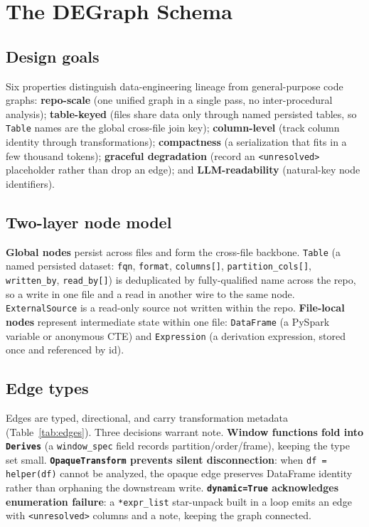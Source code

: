 \documentclass[11pt]{article}
\newcommand{\code}[1]{\texttt{#1}}
\begin{document}
\section{The DEGraph Schema}

\subsection{Design goals}
Six properties distinguish data-engineering lineage from general-purpose code
graphs: \textbf{repo-scale} (one unified graph in a single pass, no
inter-procedural analysis); \textbf{table-keyed} (files share data only through
named persisted tables, so \code{Table} names are the global cross-file join key);
\textbf{column-level} (track column identity through transformations);
\textbf{compactness} (a serialization that fits in a few thousand tokens);
\textbf{graceful degradation} (record an \code{<unresolved>} placeholder rather than
drop an edge); and \textbf{LLM-readability} (natural-key node identifiers).

\subsection{Two-layer node model}
\textbf{Global nodes} persist across files and form the cross-file backbone.
\code{Table} (a named persisted dataset: \code{fqn}, \code{format},
\code{columns[]}, \code{partition_cols[]}, \code{written_by}, \code{read_by[]}) is
deduplicated by fully-qualified name across the repo, so a write in one file and a
read in another wire to the same node. \code{ExternalSource} is a read-only source
not written within the repo. \textbf{File-local nodes} represent intermediate state
within one file: \code{DataFrame} (a PySpark variable or anonymous CTE) and
\code{Expression} (a derivation expression, stored once and referenced by id).

\subsection{Edge types}
Edges are typed, directional, and carry transformation metadata
(Table~\ref{tab:edges}). Three decisions warrant note. \textbf{Window functions
fold into \code{Derives}} (a \code{window_spec} field records partition/order/frame),
keeping the type set small. \textbf{\code{OpaqueTransform} prevents silent
disconnection}: when \code{df = helper(df)} cannot be analyzed, the opaque edge
preserves DataFrame identity rather than orphaning the downstream write.
\textbf{\code{dynamic=True} acknowledges enumeration failure}: a \code{*expr_list}
star-unpack built in a loop emits an edge with \code{<unresolved>} columns and a
note, keeping the graph connected.
\end{document}
